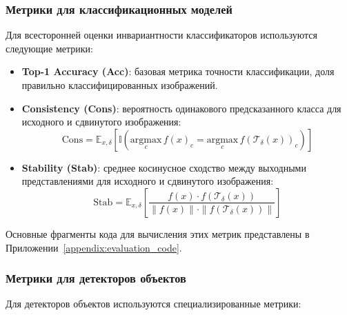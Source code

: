 \subsubsection{Метрики для классификационных моделей}
\label{sec:evaluation:classification}

Для всесторонней оценки инвариантности классификаторов используются следующие метрики:

\begin{itemize}
    \item \textbf{Top-1 Accuracy (Acc)}: базовая метрика точности классификации, доля правильно классифицированных изображений.
    
    \item \textbf{Consistency (Cons)}: вероятность одинакового предсказанного класса для исходного и сдвинутого изображения:
    \begin{equation}
    \text{Cons} = \mathbb{E}_{x, \delta} \left[ \mathbb{I} \left( \underset{c}{\text{argmax}} \, f(x)_c = \underset{c}{\text{argmax}} \, f(\mathcal{T}_\delta(x))_c \right) \right]
    \end{equation}
    
    \item \textbf{Stability (Stab)}: среднее косинусное сходство между выходными представлениями для исходного и сдвинутого изображения:
    \begin{equation}
    \text{Stab} = \mathbb{E}_{x, \delta} \left[ \frac{f(x) \cdot f(\mathcal{T}_\delta(x))}{\|f(x)\| \cdot \|f(\mathcal{T}_\delta(x))\|} \right]
    \end{equation}
\end{itemize}

Основные фрагменты кода для вычисления этих метрик представлены в Приложении~\ref{appendix:evaluation_code}.

\subsubsection{Метрики для детекторов объектов}
\label{sec:evaluation:detection}

Для детекторов объектов используются специализированные метрики:

